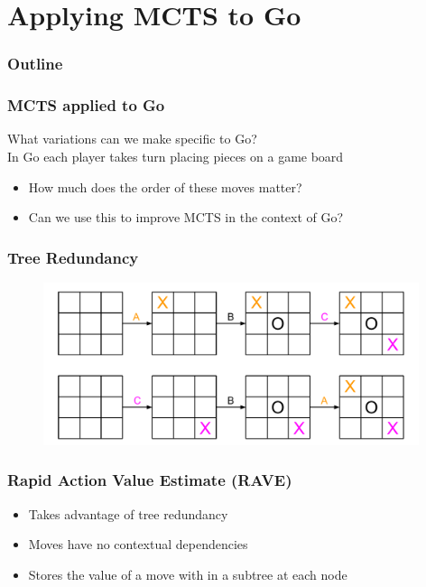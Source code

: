 \documentclass{beamer}
\begin{document}
\section{Applying MCTS to Go}

\begin{frame}
\frametitle{Outline}
\tableofcontents[currentsection]
\end{frame}

\begin{frame}
\frametitle{MCTS applied to Go}
What variations can we make specific to Go? \\
In Go each player takes turn placing pieces on a game board
\begin{itemize}
	\item How much does the order of these moves matter?
	\item Can we use this to improve MCTS in the context of Go?
\end{itemize}
\end{frame}

\begin{frame}[fragile]
\frametitle{Tree Redundancy}
\begin{figure}[h]
	\includegraphics[width=11cm]{Diagrams/TicTacToe/MoveOrderNotMattering.pdf}
	\centering
\end{figure}
\end{frame}

\begin{frame}
\frametitle{Rapid Action Value Estimate (RAVE)}
\begin{itemize}
	\item Takes advantage of tree redundancy
	\item Moves have no contextual dependencies
	\item Stores the value of a move with in a subtree at each node
\end{itemize}
\end{frame}

\end{document}
